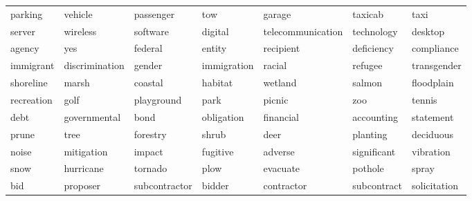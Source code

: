 \begin{table}[ht]
\begin{tabular}{lllllll}
  \cellcolor{blue!10}parking & \cellcolor{blue!10}vehicle & \cellcolor{blue!10}passenger & \cellcolor{blue!10}tow & \cellcolor{blue!10}garage & \cellcolor{blue!10}taxicab & \cellcolor{blue!10}taxi \\ 
  \cellcolor{red!10}server & \cellcolor{red!10}wireless & \cellcolor{red!10}software & \cellcolor{red!10}digital & \cellcolor{red!10}telecommunication & \cellcolor{red!10}technology & \cellcolor{red!10}desktop \\ 
  \cellcolor{blue!10}agency & \cellcolor{blue!10}yes & \cellcolor{blue!10}federal & \cellcolor{blue!10}entity & \cellcolor{blue!10}recipient & \cellcolor{blue!10}deficiency & \cellcolor{blue!10}compliance \\ 
  \cellcolor{red!10}immigrant & \cellcolor{red!10}discrimination & \cellcolor{red!10}gender & \cellcolor{red!10}immigration & \cellcolor{red!10}racial & \cellcolor{red!10}refugee & \cellcolor{red!10}transgender \\ 
  \cellcolor{white}shoreline & \cellcolor{white}marsh & \cellcolor{white}coastal & \cellcolor{white}habitat & \cellcolor{white}wetland & \cellcolor{white}salmon & \cellcolor{white}floodplain \\ 
  \cellcolor{white}recreation & \cellcolor{white}golf & \cellcolor{white}playground & \cellcolor{white}park & \cellcolor{white}picnic & \cellcolor{white}zoo & \cellcolor{white}tennis \\ 
  \cellcolor{blue!10}debt & \cellcolor{blue!10}governmental & \cellcolor{blue!10}bond & \cellcolor{blue!10}obligation & \cellcolor{blue!10}financial & \cellcolor{blue!10}accounting & \cellcolor{blue!10}statement \\ 
  \cellcolor{blue!10}prune & \cellcolor{blue!10}tree & \cellcolor{blue!10}forestry & \cellcolor{blue!10}shrub & \cellcolor{blue!10}deer & \cellcolor{blue!10}planting & \cellcolor{blue!10}deciduous \\ 
  \cellcolor{blue!10}noise & \cellcolor{blue!10}mitigation & \cellcolor{blue!10}impact & \cellcolor{blue!10}fugitive & \cellcolor{blue!10}adverse & \cellcolor{blue!10}significant & \cellcolor{blue!10}vibration \\ 
  \cellcolor{red!20}snow & \cellcolor{red!20}hurricane & \cellcolor{red!20}tornado & \cellcolor{red!20}plow & \cellcolor{red!20}evacuate & \cellcolor{red!20}pothole & \cellcolor{red!20}spray \\ 
  \cellcolor{red!10}bid & \cellcolor{red!10}proposer & \cellcolor{red!10}subcontractor & \cellcolor{red!10}bidder & \cellcolor{red!10}contractor & \cellcolor{red!10}subcontract & \cellcolor{red!10}solicitation \\ 

\end{tabular}
\end{table}
